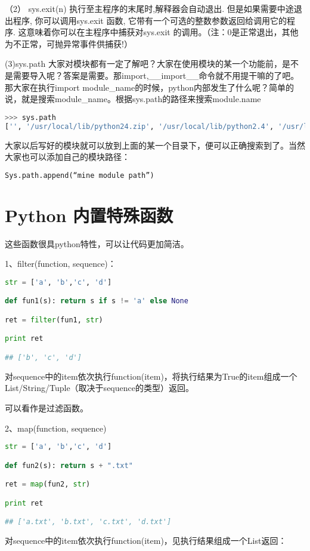 （2） sys.exit(n)
执行至主程序的末尾时,解释器会自动退出. 但是如果需要中途退出程序, 你可以调用sys.exit 函数, 它带有一个可选的整数参数返回给调用它的程序. 这意味着你可以在主程序中捕获对sys.exit 的调用。（注：0是正常退出，其他为不正常，可抛异常事件供捕获!）


(3)sys.path
大家对模块都有一定了解吧？大家在使用模块的某一个功能前，是不是需要导入呢？答案是需要。那import,\_\_import\_\_命令就不用提干嘛的了吧。那大家在执行import module\_name的时候，python内部发生了什么呢？简单的说，就是搜索module\_name。根据sys.path的路径来搜索module.name
\begin{lstlisting}[language=Python]
>>> sys.path
['', '/usr/local/lib/python24.zip', '/usr/local/lib/python2.4', '/usr/local/lib/python2.4/plat-freebsd4', '/usr/local/lib/python2.4/lib-tk', '/usr/local/lib/python2.4/lib-dynload', '/usr/local/lib/python2.4/site-packages']
\end{lstlisting}
大家以后写好的模块就可以放到上面的某一个目录下，便可以正确搜索到了。当然大家也可以添加自己的模块路径：
\begin{lstlisting}[language=Python]
Sys.path.append(“mine module path”)
\end{lstlisting}



\section{Python 内置特殊函数}
这些函数很具python特性，可以让代码更加简洁。

1、filter(function, sequence)：
\begin{lstlisting}[language=Python]
str = ['a', 'b','c', 'd']

def fun1(s): return s if s != 'a' else None

ret = filter(fun1, str)

print ret

## ['b', 'c', 'd']
\end{lstlisting}
对sequence中的item依次执行function(item)，将执行结果为True的item组成一个List/String/Tuple（取决于sequence的类型）返回。

可以看作是过滤函数。


 2、map(function, sequence) 
\begin{lstlisting}[language=Python]
str = ['a', 'b','c', 'd'] 

def fun2(s): return s + ".txt"

ret = map(fun2, str)

print ret

## ['a.txt', 'b.txt', 'c.txt', 'd.txt']
\end{lstlisting}
对sequence中的item依次执行function(item)，见执行结果组成一个List返回：

